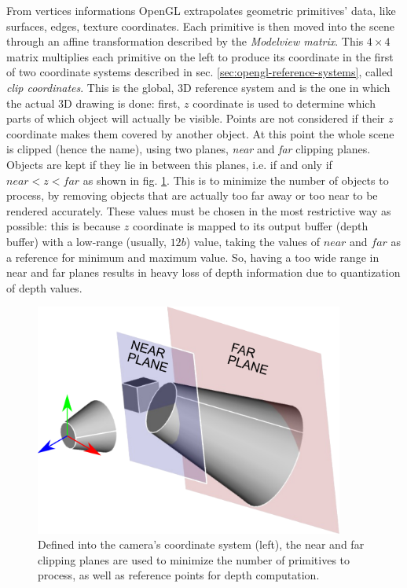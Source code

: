 From vertices informations OpenGL extrapolates geometric primitives'
data, like surfaces, edges, texture coordinates.
Each primitive is then moved into the scene through an affine transformation
described by the \emph{Modelview matrix}. This $4 \times 4$ matrix multiplies
each primitive on the left to produce its coordinate in the first of two
coordinate systems described in sec. \ref{sec:opengl-reference-systems}, called
\emph{clip coordinates}. This is the global, 3D reference system and is the one in
which the actual 3D drawing is done: first, $z$ coordinate is used to determine
which parts of which object will actually be visible. Points are not considered
if their $z$ coordinate makes them covered by another object. At this point the
whole scene is clipped (hence the name), using two planes, \emph{near} and
\emph{far} clipping planes. Objects are kept if they lie in between this planes,
i.e. if and only if $near<z<far$ as shown in fig. \ref{fig:clipping-planes}.
This is to minimize the number of objects to process, by removing objects that
are actually too far away or too near to be rendered accurately. These values
must be chosen in the most restrictive way as possible: this is because $z$
coordinate is mapped to its output buffer (depth buffer) with a low-range
(usually, $12\unit{b}$) value, taking the values of $near$ and $far$ as a
reference for minimum and maximum value. So, having a too wide range in near and
far planes results in heavy loss of depth information due to quantization of
depth values.

\begin{figure}[htbp]
  \centering
  \includegraphics[width=4in]{./Graphics/clipping_planes}
  \caption{Defined into the camera's coordinate system (left), the near and far clipping planes are used to minimize the number of
  primitives to process, as well as reference points for depth computation. \label{fig:clipping-planes}}
\end{figure}

